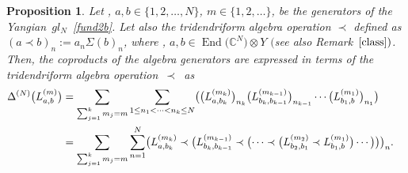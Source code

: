 \documentclass[10pt,a4paper]{amsart}
\numberwithin{equation}{section}
\newtheorem{pro}[thm]{Proposition}
\theoremstyle{definition}
\DeclareMathOperator{\EEnd}{End}%
\def\mathfrak#1{#1}%
\def\mathcal#1{#1}%
\begin{document}
\begin{pro} Let , $a,b \in \{1, 2,\dots, {\mathcal N } \}$, $m
\in\{1, 2, \dots\}$, be the generators of the Yangian~$\mathfrak{gl}_{\mathcal N}$~\eqref{fund2b}. Let also the tridendriform algebra operation $\prec$ defined as
$(a\prec b)_n := a_n\Sigma(b)_n $, where , $a, b \in \EEnd\bigl({\mathbb C}^{\mathcal N}\bigr) \otimes{\mathcal Y}$ $($see also Remark~$\ref{class})$. Then, the coproducts of the algebra generators are expressed in terms of the tridendriform algebra operation~$\prec$~as
\begin{align}
\Delta^{(N)}\bigl(L^{(m)}_{a,b}\bigr) &= \sum_{\sum_{j=1}^km_j=m}\sum_{1\leq n_1<\cdots < n_k\leq N} \bigl(\bigl(L^{(m_k)}_{a,b_k}\bigr)_{n_k}\bigl(L^{(m_{k-1})}_{b_k,b_{k-1}}\bigr)_{n_{k-1}} \cdots \bigl(L^{(m_1)}_{b_1, b} \bigr)_{n_1} \bigr)\cr
 &= \sum_{\sum_{j=1}^km_j=m} \sum_{n=1}^N \bigl(L^{(m_k)}_{a,b_k} \prec\bigl( L^{(m_{k-1})}_{b_k,b_{k-1}}\prec \bigl( \cdots \prec \bigl( L^{(m_2)}_{b_2, b_1}\prec L^{(m_1)}_{b_1, b} \bigr) \cdots \bigr)\bigr) \bigr)_n. \label{mine}
\end{align}
\end{pro}
\end{document}
